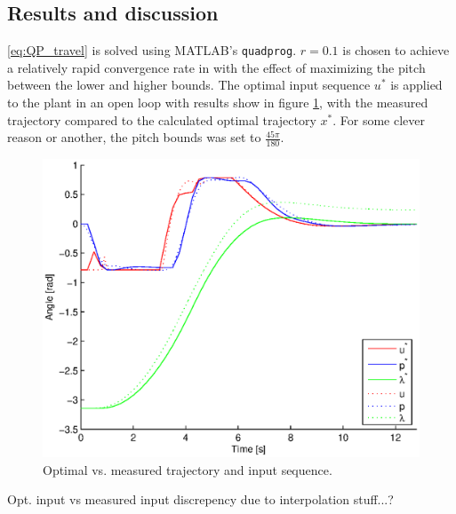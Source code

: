\subsection{Results and discussion}
\eqref{eq:QP_travel} is solved using MATLAB's \texttt{quadprog}. $r = 0.1$ is chosen to achieve a relatively rapid convergence rate in with the effect of maximizing the pitch between the lower and higher bounds. The optimal input sequence $u^*$ is applied to the plant in an open loop with results show in figure \ref{fig:opt_openloop}, with the measured trajectory compared to the calculated optimal trajectory $x^*$. For some clever reason or another, the pitch bounds was set to $\frac{45 \pi}{180}$.

\begin{figure}[hp]
	\centering
		\includegraphics[width=1.00\textwidth]{figures/2/opt_vs_meas_traj.eps}
	\caption{Optimal vs. measured trajectory and input sequence.}
	\label{fig:opt_openloop}
\end{figure}

Opt. input vs measured input discrepency due to interpolation stuff...?

